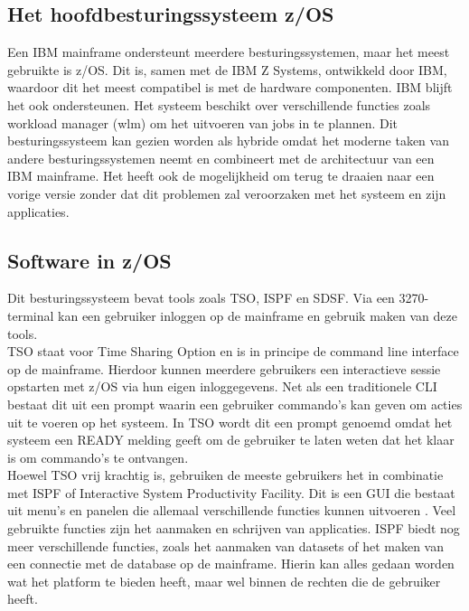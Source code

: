 \subsection{Het hoofdbesturingssysteem z/OS}
Een IBM mainframe ondersteunt meerdere besturingssystemen, maar het meest gebruikte is z/OS. Dit is, samen met de IBM Z Systems, ontwikkeld door IBM, waardoor dit het meest compatibel is met de hardware componenten. IBM blijft het ook ondersteunen. Het systeem beschikt over verschillende functies zoals workload manager (wlm) om het uitvoeren van jobs in te plannen. Dit besturingssysteem kan gezien worden als hybride omdat het moderne taken van andere besturingssystemen neemt en combineert met de architectuur van een IBM mainframe. Het heeft ook de mogelijkheid om terug te draaien naar een vorige versie zonder dat dit problemen zal veroorzaken met het systeem en zijn applicaties. \autocite{Rupp2022} 

\subsection{Software in z/OS}
Dit besturingssysteem bevat tools zoals TSO, ISPF en SDSF. Via een 3270-terminal kan een gebruiker inloggen op de mainframe en gebruik maken van deze tools. \\

TSO staat voor Time Sharing Option en is in principe de command line interface op de mainframe. Hierdoor kunnen meerdere gebruikers een interactieve sessie opstarten met z/OS via hun eigen inloggegevens. Net als een traditionele CLI bestaat dit uit een prompt waarin een gebruiker commando's kan geven om acties uit te voeren op het systeem. In TSO wordt dit een  prompt genoemd omdat het systeem een READY melding geeft om de gebruiker te laten weten dat het klaar is om commando's te ontvangen. \autocite{IBM} \\

Hoewel TSO vrij krachtig is, gebruiken de meeste gebruikers het in combinatie met ISPF of Interactive System Productivity Facility. Dit is een GUI die bestaat uit menu's en panelen die allemaal verschillende functies kunnen uitvoeren \autocite{IBM}. Veel gebruikte functies zijn het aanmaken en schrijven van applicaties. ISPF biedt nog meer verschillende functies, zoals het aanmaken van datasets of het maken van een connectie met de database op de mainframe. Hierin kan alles gedaan worden wat het platform te bieden heeft, maar wel binnen de rechten die de gebruiker heeft. \autocite{IBM} \\

